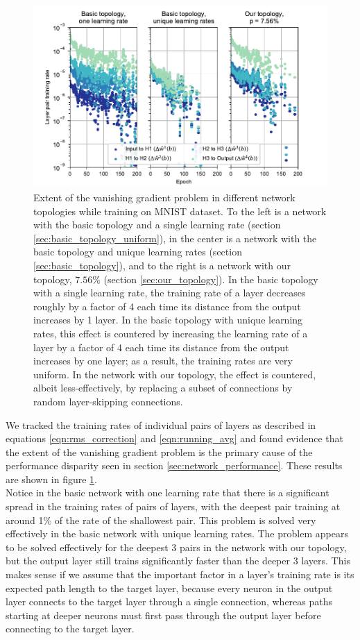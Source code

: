 \documentclass[format=sigconf]{acmart}
\newcommand{\npar}{\\\indent}
\begin{document}
\begin{figure}
  \centering
  \includegraphics[width=\columnwidth]{figures/MNIST_individual_layers.pdf}
  \caption{Extent of the vanishing gradient problem in different network topologies while training on MNIST dataset. To the left is a network with the basic topology and a single learning rate (section \ref{sec:basic_topology_uniform}), in the center is a network with the basic topology and unique learning rates (section \ref{sec:basic_topology}), and to the right is a network with our topology, $7.56\%$ (section \ref{sec:our_topology}). In the basic topology with a single learning rate, the training rate of a layer decreases roughly by a factor of 4 each time its distance from the output increases by 1 layer. In the basic topology with unique learning rates, this effect is countered by increasing the learning rate of a layer by a factor of 4 each time its distance from the output increases by one layer; as a result, the training rates are very uniform. In the network with our topology, the effect is countered, albeit less-effectively, by replacing a subset of connections by random layer-skipping connections.}  
  \label{fig:mnist_layers}
\end{figure}

We tracked the training rates of individual pairs of layers as described in equations \ref{eqn:rms_correction} and \ref{eqn:running_avg} and found evidence that the extent of the vanishing gradient problem is the primary cause of the performance disparity seen in section \ref{sec:network_performance}. These results are shown in figure \ref{fig:mnist_layers}.
\npar
Notice in the basic network with one learning rate that there is a significant spread in the training rates of pairs of layers, with the deepest pair training at around 1\% of the rate of the shallowest pair. This problem is solved very effectively in the basic network with unique learning rates. The problem appears to be solved effectively for the deepest 3 pairs in the network with our topology, but the output layer still trains significantly faster than the deeper 3 layers. This makes sense if we assume that the important factor in a layer's training rate is its expected path length to the target layer, because every neuron in the output layer connects to the target layer through a single connection, whereas paths starting at deeper neurons must first pass through the output layer before connecting to the target layer.
\end{document}
